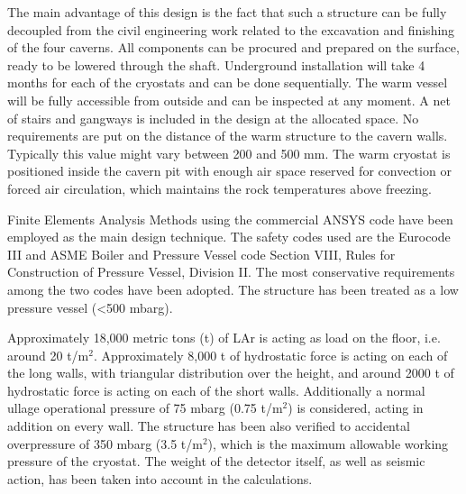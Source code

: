 The main advantage of this design is the fact that such a structure 
can be fully decoupled from the civil engineering work related to
the excavation and finishing of the four caverns. All components 
can be procured and prepared on the surface, ready to be lowered 
through the shaft. Underground installation will take 4 
months for each of the cryostats and can be done sequentially.  
The warm vessel will be fully accessible from outside and can be 
inspected at any moment. A net of stairs and gangways is included 
in the design at the allocated space. No requirements are put on 
the distance of the warm structure to the cavern walls. Typically
 this value might vary between 200 and 500 mm. The warm cryostat 
is positioned inside the cavern pit with enough air space 
reserved for convection or forced air circulation, which maintains 
the rock temperatures above freezing.

Finite Elements Analysis Methods using the commercial ANSYS code 
have been employed as the main design technique. The safety codes 
used are the Eurocode III and ASME Boiler and Pressure Vessel code 
Section VIII, Rules for Construction of Pressure Vessel, 
Division II. The most conservative requirements among the two 
codes have been adopted. The structure has been treated as a 
low pressure vessel (<500 mbarg). 

Approximately 18,000 metric tons (t) of LAr is acting as load on the floor, i.e. 
around 20 t/m$^{2}$. Approximately 8,000 t of hydrostatic force is acting 
on each of the long walls, with triangular distribution over the 
height, and around 2000 t of hydrostatic force is acting on each 
of the short walls.  Additionally a normal ullage operational pressure 
of 75 mbarg (0.75 t/m$^{2}$) is considered, acting in addition on every 
wall. The structure has been also verified to accidental overpressure 
of 350 mbarg (3.5 t/m$^{2}$), which is the maximum allowable working pressure 
of the cryostat.  The weight of the detector itself, as well as 
seismic action, has been taken into account in the calculations.

